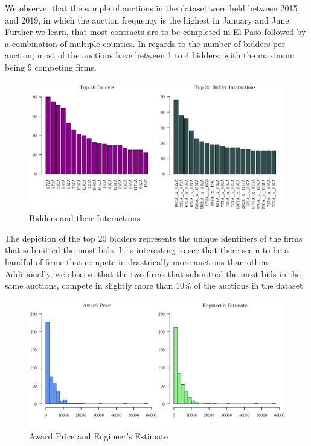 \documentclass[a4paper,12pt, headsepline]{scrartcl}
\numberwithin{equation}{section}
\begin{document}
We observe, that the sample of auctions in the dataset were held between 2015 and 2019, in which the auction frequency is the highest in January and June. Further we learn, that most contracts are to be completed in El Paso followed by a combination of multiple counties. In regards to the number of bidders per auction, most of the auctions have between 1 to 4 bidders, with the maximum being 9 competing firms.

\begin{figure}[H]
	\includegraphics[width = 14	cm]{figures/vend_plots.pdf}
	\caption{Bidders and their Interactions}\label{fig:vendplots}
\end{figure}

The depiction of the top 20 bidders represents the unique identifiers of the firms that submitted the most bids. It is interesting to see that there seem to be a handful of firms that compete in drastrically more auctions than others. Additionally, we observe that the two firms that submitted the most bids in the same auctions, compete in slightly more than 10\% of the auctions in the dataset.

\begin{figure}[H]
	\includegraphics[width = 14	cm]{figures/aw_eng_hist.pdf}
	\caption{Award Price and Engineer's Estimate}\label{fig:aweng}
\end{figure}
\end{document}
